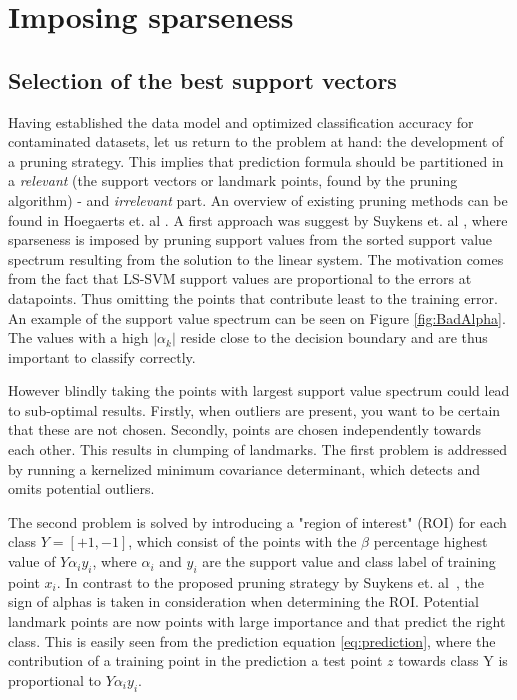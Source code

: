 \documentclass[preprint,12pt]{elsarticle}
\begin{document}
\newpage
\FloatBarrier

\section{Imposing sparseness}

\subsection{Selection of the best support vectors}

Having established the data model and optimized classification accuracy for contaminated datasets, let us return to the problem at hand: the development of a pruning strategy. This implies that prediction formula should be partitioned in a \textit{relevant} (the support vectors or landmark points, found by the pruning algorithm) - and \textit{irrelevant} part.  An overview of existing pruning methods can be found in Hoegaerts et. al \cite{hoegaerts2004comparison}. A first approach was suggest by Suykens et. al \cite{suykens2000sparse}, where  sparseness is imposed by pruning support values from the sorted support value spectrum resulting from the solution to the linear system.  The motivation comes from the fact that LS-SVM support values are proportional to the errors at datapoints. Thus omitting the points that contribute least to the training error. An example of the support value spectrum can be seen on Figure \ref{fig:BadAlpha}. The values with a high $|\alpha_k|$ reside close to the decision boundary and are thus important to classify correctly. 

However blindly taking the points with largest support value spectrum could lead to sub-optimal results. Firstly, when outliers are present, you want to be certain that these are not chosen. Secondly, points are chosen independently towards each other. This results in clumping of landmarks. The first problem is addressed by running a kernelized minimum covariance determinant, which detects and omits potential outliers. 

The second problem is solved by introducing a "region of interest" (ROI) for each class $Y = [+1,-1]$, which consist of the points with the $\beta$ percentage highest value of $Y \alpha_iy_i$, where $\alpha_i$ and $y_i$ are the support value and class label of training point $x_i$. In contrast to the proposed pruning strategy by Suykens et. al~\cite{suykens2000sparse}, the sign of alphas is taken in consideration when determining the ROI. Potential landmark points are now points with large importance and that predict the right class. This is easily seen from the prediction equation \eqref{eq:prediction}, where the contribution of a training point in the prediction a test point $z$ towards class Y is proportional to $Y \alpha_iy_i$. 
\end{document}
